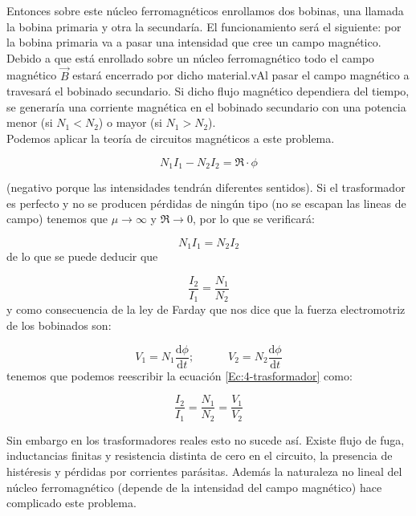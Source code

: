 \documentclass[12pt,a4paper]{article}
\newcommand{\D}{\mathrm{d}}
\newcommand{\tquad}{\quad \quad \quad}
\begin{document}
Entonces sobre este núcleo ferromagnéticos enrollamos dos bobinas, una llamada la bobina primaria y otra la secundaría. El funcionamiento será el siguiente: por la bobina primaria va a pasar una intensidad que cree un campo magnético. Debido a que está enrollado sobre un núcleo ferromagnético todo el campo magnético $\vec{B}$ estará encerrado por dicho material.vAl pasar el campo magnético a travesará el bobinado secundario. Si dicho flujo magnético dependiera del tiempo, se generaría una corriente magnética en el bobinado secundario con una potencia menor (si $N_1 < N_2$) o mayor (si $N_1 > N_2$).  \\

Podemos aplicar la teoría de circuitos magnéticos a este problema.

\begin{equation}
N_1 I_1 - N_2 I_2 = \mathfrak{R} \cdot \phi
\end{equation}

(negativo porque las intensidades tendrán diferentes sentidos). Si el trasformador es perfecto y no se producen pérdidas de ningún tipo (no se escapan las lineas de campo) tenemos que $\mu \rightarrow \infty$ y $\mathfrak{R} \rightarrow 0$, por lo que se verificará:

\begin{equation}
N_1 I_1 = N_2 I_2
\end{equation}
de lo que se puede deducir que

\begin{equation}
\dfrac{I_2}{I_1} = \dfrac{N_1}{N_2} \label{Ec:4-trasformador}
\end{equation}
y como consecuencia de la ley de Farday que nos dice que la fuerza electromotriz de los bobinados son:

\begin{equation}
V_1 = N_1 \dfrac{\D \phi}{\D t}; \tquad V_2 = N_2 \dfrac{\D \phi}{\D t}
\end{equation}
tenemos que podemos reescribir la ecuación \ref{Ec:4-trasformador} como:


\begin{equation}
\dfrac{I_2}{I_1} = \dfrac{N_1}{N_2} = \dfrac{V_1}{V_2}
\end{equation}

Sin embargo en los trasformadores reales esto no sucede así. Existe flujo de fuga, inductancias finitas y resistencia distinta de cero en el circuito, la presencia de histéresis y pérdidas por corrientes parásitas. Además la naturaleza no lineal del núcleo ferromagnético (depende de la intensidad del campo magnético) hace complicado este problema. \\
\end{document}
